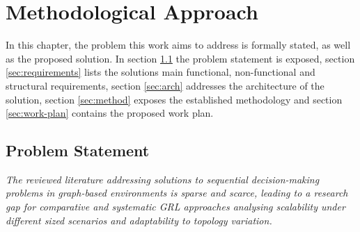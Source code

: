 \chapter{Methodological Approach} \label{chap:method-approach}

In this chapter, the problem this work aims to address is formally stated, as well as the proposed solution. In section \ref{sec:problem} the problem statement is exposed, section \ref{sec:requirements} lists the solutions main functional, non-functional and structural requirements, section \ref{sec:arch} addresses the architecture of the solution, section \ref{sec:method} exposes the established methodology and section \ref{sec:work-plan} contains the proposed work plan.

\section{Problem Statement} \label{sec:problem}

\begin{displayquote}
	 \textit{The reviewed literature addressing solutions to sequential decision-making problems in graph-based environments is sparse and scarce, leading to a research gap for comparative and systematic \ac{GRL} approaches analysing scalability under different sized scenarios and adaptability to topology variation.}
\end{displayquote}


